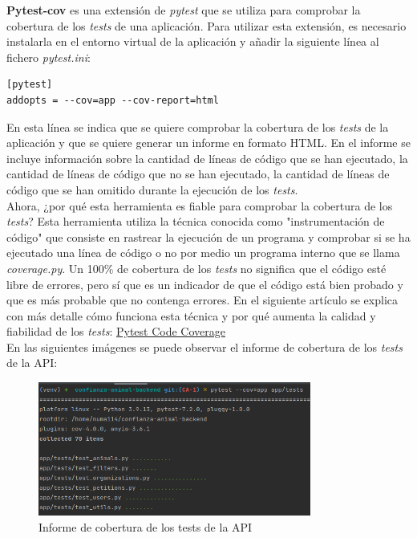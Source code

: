 \newpage

\textbf{Pytest-cov} es una extensión de \textit{pytest} que se utiliza para comprobar la cobertura de los \textit{tests} de una aplicación.
Para utilizar esta extensión, es necesario instalarla en el entorno virtual de la aplicación y añadir la
siguiente línea al fichero \textit{pytest.ini}:

\begin{lstlisting}
[pytest]
addopts = --cov=app --cov-report=html
\end{lstlisting}

En esta línea se indica que se quiere comprobar la cobertura de los \textit{tests} de la aplicación y que se quiere generar un informe en formato HTML.
En el informe se incluye información sobre la cantidad de líneas de código que se han ejecutado, la cantidad de líneas de código que no se han ejecutado,
la cantidad de líneas de código que se han omitido durante la ejecución de los \textit{tests}. \\

Ahora, ¿por qué esta herramienta es fiable para comprobar la cobertura de los \textit{tests}? Esta herramienta utiliza la
técnica conocida como "instrumentación de código" que consiste en rastrear la ejecución de un programa y comprobar si se ha ejecutado
una línea de código o no por medio un programa interno que se llama \textit{coverage.py}. Un 100\% de cobertura de los \textit{tests} no significa
que el código esté libre de errores, pero sí que es un indicador de que el código está bien probado y que es más probable que no contenga errores.
En el siguiente artículo se explica con más detalle
cómo funciona esta técnica y por qué aumenta la calidad y fiabilidad de los \textit{tests}: \href{https://www.codemag.com/article/1701081/Improve-Code-Quality-Using-Test-Coverage}{Pytest Code Coverage} \\

En las siguientes imágenes se puede observar el informe de cobertura de los \textit{tests} de la API:

\begin{figure}[H]
    \centering
    \includegraphics[width=0.8\textwidth]{imgs/coverage2-big.png}
    \caption{Informe de cobertura de los tests de la API}
    \label{fig:coverage2}
\end{figure}

